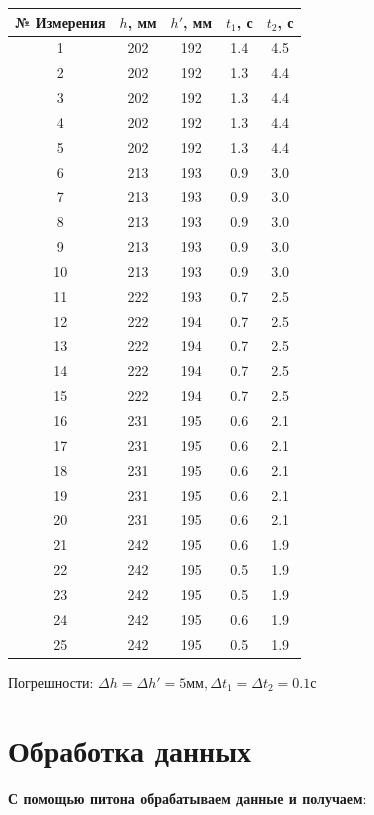 \documentclass[a4paper]{article}
\begin{document}
\begin{table}[ht]
\begin{tabular}{|c|c|c|c|c|}
\hline
\textbf{№ Измерения} & \textbf{$h$, мм} & \textbf{$h'$, мм}& \textbf{$t_1$, с} & \textbf{$t_2$, с} \\
\hline
1 & 202 & 192 & 1.4 & 4.5 \\
\hline
2 & 202 & 192 & 1.3 & 4.4 \\
\hline
3 & 202 & 192 & 1.3 & 4.4 \\
\hline
4 & 202 & 192 & 1.3 & 4.4 \\
\hline
5 & 202 & 192 & 1.3 & 4.4 \\
\hline
6 & 213 & 193 & 0.9 & 3.0 \\
\hline
7 & 213 & 193 & 0.9 & 3.0 \\
\hline
8 & 213 & 193 & 0.9 & 3.0 \\
\hline
9 & 213 & 193 & 0.9 & 3.0 \\
\hline
10 & 213 & 193 & 0.9 & 3.0 \\
\hline
11 & 222 & 193 & 0.7 & 2.5 \\
\hline
12 & 222 & 194 & 0.7 & 2.5 \\
\hline
13 & 222 & 194 & 0.7 & 2.5 \\
\hline
14 & 222 & 194 & 0.7 & 2.5 \\
\hline
15 & 222 & 194 & 0.7 & 2.5 \\
\hline
16 & 231 & 195 & 0.6 & 2.1 \\
\hline
17 & 231 & 195 & 0.6 & 2.1 \\
\hline
18 & 231 & 195 & 0.6 & 2.1 \\
\hline
19 & 231 & 195 & 0.6 & 2.1 \\
\hline
20 & 231 & 195 & 0.6 & 2.1 \\
\hline
21 & 242 & 195 & 0.6 & 1.9 \\
\hline
22 & 242 & 195 & 0.5 & 1.9 \\
\hline
23 & 242 & 195 & 0.5 & 1.9 \\
\hline
24 & 242 & 195 & 0.6 & 1.9 \\
\hline
25 & 242 & 195 & 0.5 & 1.9 \\
\hline
\end{tabular}
\end{table}
\begin{center}
Погрешности: $\Delta h= \Delta h'=5\text{мм}, \Delta t_1=\Delta t_2=0.1\text{с}$
\end{center}


\section{Обработка данных}
\textbf{С помощью питона обрабатываем данные и получаем}:
\end{document}
